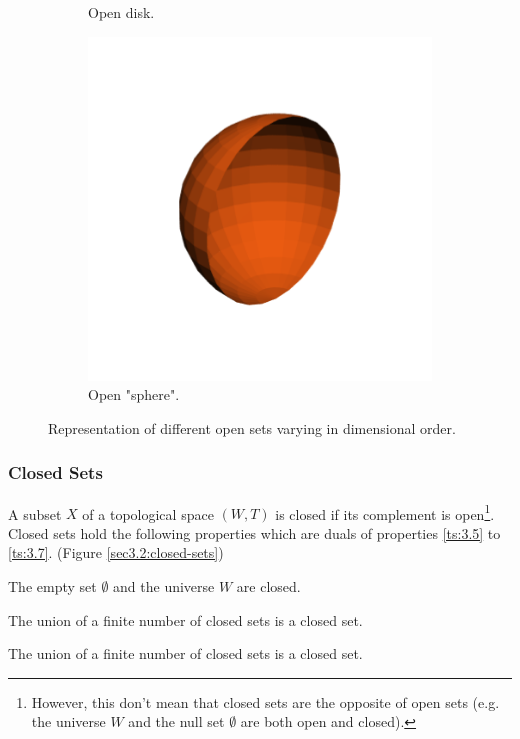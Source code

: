 \documentclass[a4paper,11pt,oneside]{article}
\begin{document}
\begin{figure}[ht]
\begin{subfigure}[b]{0.2\textwidth}
         \caption{Open disk.}
     \end{subfigure}
     \hfill
     \begin{subfigure}[b]{0.2\textwidth}
         \centering
         \includegraphics[width=\textwidth]{section3/3.2/open-sphere.png}
         \caption{Open "sphere".}
     \end{subfigure}
     \hfill
        \caption{Representation of different open sets varying in dimensional order.}
        \label{sec3.2:open-sets}
\end{figure}

   
    
\subsubsection{Closed Sets}
\begin{definition}
	A subset $X$ of a topological space $(W, T)$ is closed if its complement is open\footnote{However, this don't mean that closed sets are the opposite of open sets (e.g. the universe $W$ and the null set $\emptyset$ are both open and closed)\cite{mansfield_1987}.}. Closed sets hold the following properties which are duals of properties \eqref{ts:3.5} to \eqref{ts:3.7}. (Figure \ref{sec3.2:closed-sets})
		    
	\begin{property}
		The empty set $\emptyset$ and the universe $W$ are closed. \cite{mansfield_1987}
	\end{property}
	\begin{property}
		The union of a finite number of closed sets is a closed set. \cite{mansfield_1987}
	\end{property}
	\begin{property}
		The union of a finite number of closed sets is a closed set. \cite{mansfield_1987}
	\end{property}
\end{definition}
    
\end{document}
